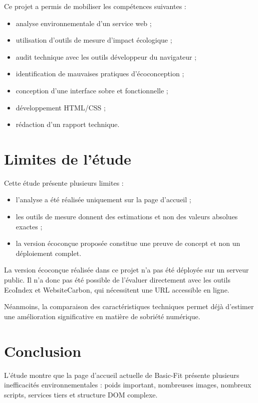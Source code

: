 \documentclass[11pt,a4paper]{article}
\begin{document}
Ce projet a permis de mobiliser les compétences suivantes :

\begin{itemize}
\item analyse environnementale d'un service web ;
\item utilisation d'outils de mesure d'impact écologique ;
\item audit technique avec les outils développeur du navigateur ;
\item identification de mauvaises pratiques d'écoconception ;
\item conception d'une interface sobre et fonctionnelle ;
\item développement HTML/CSS ;
\item rédaction d'un rapport technique.
\end{itemize}

\section{Limites de l'étude}

Cette étude présente plusieurs limites :

\begin{itemize}
\item l'analyse a été réalisée uniquement sur la page d'accueil ;
\item les outils de mesure donnent des estimations et non des valeurs absolues exactes ;
\item la version écoconçue proposée constitue une preuve de concept et non un déploiement complet.
\end{itemize}

La version écoconçue réalisée dans ce projet n'a pas été déployée sur un serveur public. Il n'a donc pas été possible de l'évaluer directement avec les outils EcoIndex et WebsiteCarbon, qui nécessitent une URL accessible en ligne.

Néanmoins, la comparaison des caractéristiques techniques permet déjà d'estimer une amélioration significative en matière de sobriété numérique.

\section{Conclusion}

L'étude montre que la page d'accueil actuelle de Basic-Fit présente plusieurs inefficacités environnementales : poids important, nombreuses images, nombreux scripts, services tiers et structure DOM complexe.
\end{document}
